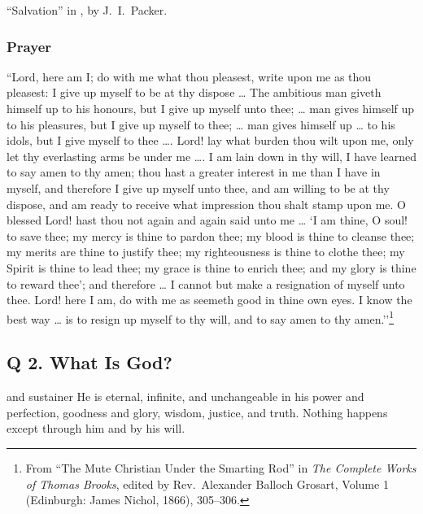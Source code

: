 \documentclass[00-main.tex]{subfiles}
\begin{document}
``Salvation'' in , by J.\ I.\ Packer.

\subsubsection{Prayer}

\label{q1prayer}``Lord, here am I; do with me what thou pleasest, write upon me as thou pleasest: I give up myself to be at thy dispose \dots{} The ambitious man giveth himself up to his honours, but I give up myself unto thee; \dots{} man gives himself up to his pleasures, but I give up myself to thee; \dots{} man gives himself up \dots{} to his idols, but I give myself to thee \dots. Lord! lay what burden thou wilt upon me, only let thy everlasting arms be under me \dots. I am lain down in thy will, I have learned to say amen to thy amen; thou hast a greater interest in me than I have in myself, and therefore I give up myself unto thee, and am willing to be at thy dispose, and am ready to receive what impression thou shalt stamp upon me. O blessed Lord! hast thou not again and again said unto me \dots{} `I am thine, O soul! to save thee; my mercy is thine to pardon thee; my blood is thine to cleanse thee; my merits are thine to justify thee; my righteousness is thine to clothe thee; my Spirit is thine to lead thee; my grace is thine to enrich thee; and my glory is thine to reward thee’; and therefore \dots{} I cannot but make a resignation of myself unto thee. Lord! here I am, do with me as seemeth good in thine own eyes. I know the best way \dots{} is to resign up myself to thy will, and to say amen to thy amen.''\footnote{From ``The Mute Christian Under the Smarting Rod'' in {\em The Complete Works of Thomas Brooks}, edited by Rev.\ Alexander Balloch Grosart, Volume 1 (Edinburgh: James Nichol, 1866), 305--306.}







\subsection{Q  2. What Is God?}
and sustainer  He is eternal, infinite, and unchangeable in his power and perfection, goodness and glory, wisdom, justice, and truth. Nothing happens except through him and by his will.
\end{document}
